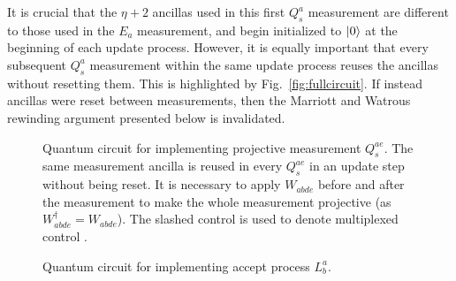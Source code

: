 \documentclass[aps,floatfix,10pt,amssymb,amsfont,amsmath,superscriptaddress,float,nofootinbib,longbibliography,nobalancelastpage,twocolumn]{revtex4-2}
\begin{document}
It is crucial that the $\eta+2$ ancillas used in this first $Q^a_s$ measurement are different to those used in the $E_a$ measurement, and begin initialized to $\ket{0}$ at the beginning of each update process. However, it is equally important that every subsequent $Q_s^a$ measurement within the same update process reuses the ancillas without resetting them. This is highlighted by Fig.~\ref{fig:fullcircuit}. If instead ancillas were reset between measurements, then the Marriott and Watrous rewinding argument presented below is invalidated.
\begin{figure}

\caption{Quantum circuit for implementing projective measurement $Q_s^{ae}$. The same measurement ancilla is reused in every $Q_s^{ae}$ in an update step without being reset. It is necessary to apply $W_{abde}$ before and after the measurement to make the whole measurement projective (as $W_{abde}^{\dagger} = W_{abde}$). The slashed control is used to denote multiplexed control \cite{low2024trading}.}
\label{fig:Qcircuit}
\end{figure}

\begin{figure}

\caption{Quantum circuit for implementing accept process $L_b^a$.}
\label{fig:LQ_circuit}
\end{figure}
\end{document}

